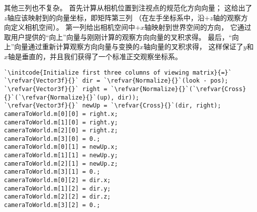 其他三列也不复杂。
首先计算从相机位置到注视点的规范化方向向量；
这给出了$z$轴应该映射到的向量坐标，即矩阵第三列
（在左手坐标系中，沿$+z$轴的观察方向定义相机空间）。
第一列给出相机空间中$+x$轴映射到世界空间的方向，
它通过取用户提供的“向上”向量与刚刚计算的观察方向向量的叉积求得。
最后，“向上”向量通过重新计算观察方向向量与变换的$x$轴向量的叉积求得，
这样保证了$y$和$x$轴是垂直的，并且我们获得了一个标准正交观察坐标系。
\begin{lstlisting}
`\initcode{Initialize first three columns of viewing matrix}{=}`
`\refvar{Vector3f}{}` dir = `\refvar{Normalize}{}`(look - pos);
`\refvar{Vector3f}{}` right = `\refvar{Normalize}{}`(`\refvar{Cross}{}`(`\refvar{Normalize}{}`(up), dir));
`\refvar{Vector3f}{}` newUp = `\refvar{Cross}{}`(dir, right);
cameraToWorld.m[0][0] = right.x;
cameraToWorld.m[1][0] = right.y;
cameraToWorld.m[2][0] = right.z;
cameraToWorld.m[3][0] = 0.;
cameraToWorld.m[0][1] = newUp.x;
cameraToWorld.m[1][1] = newUp.y;
cameraToWorld.m[2][1] = newUp.z;
cameraToWorld.m[3][1] = 0.;
cameraToWorld.m[0][2] = dir.x;
cameraToWorld.m[1][2] = dir.y;
cameraToWorld.m[2][2] = dir.z;
cameraToWorld.m[3][2] = 0.;
\end{lstlisting}